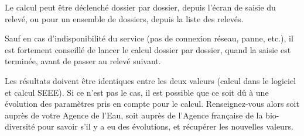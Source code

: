 Le calcul peut être déclenché dossier par dossier, depuis l'écran de saisie du relevé, ou pour un ensemble de dossiers, depuis la liste des relevés.

Sauf en cas d'indisponibilité du service (pas de connexion réseau, panne, etc.), il est fortement conseillé de lancer le calcul dossier par dossier, quand la saisie est terminée, avant de passer au relevé suivant.

Les résultats doivent être identiques entre les deux valeurs (calcul dans le logiciel et calcul SEEE). Si ce n'est pas le cas, il est possible que ce soit dû à une évolution des paramètres pris en compte pour le calcul. Renseignez-vous alors soit auprès de votre Agence de l'Eau, soit auprès de l'Agence française de la bio-diversité pour savoir s'il y a eu des évolutions, et récupérer les nouvelles valeurs.
